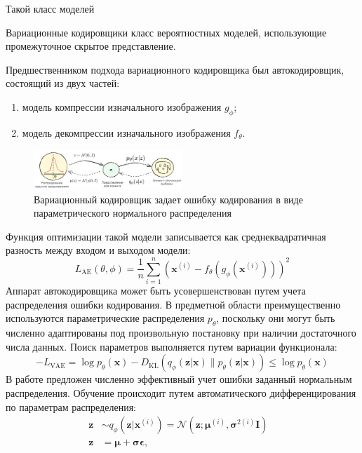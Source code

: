

Такой класс моделей

Вариационные кодировщики класс вероятностных моделей, использующие промежуточное скрытое представление.

Предшественником подхода вариационного кодировщика был автокодировщик, состоящий из двух частей: \begin{enumerate}
    \item модель компрессии изначального изображения $g_\phi$;
    \item модель декомпрессии изначального изображения $f_\theta$.
\end{enumerate}

\begin{figure}[h]
    \centering
    \includegraphics[width=0.5\textwidth]{assets/ml/generation/vae.excalidraw.png}
    \caption{Вариационный кодировщик задает ошибку кодирования в виде параметрического нормального распределения}
    \label{discr_vs_gen}
\end{figure}
Функция оптимизации такой модели записывается как среднеквадратичная разность между входом и выходом модели:
\begin{equation}
    L_\text{AE}(\theta, \phi) = \frac{1}{n}\sum_{i=1}^n (\mathbf{x}^{(i)} - f_\theta(g_\phi(\mathbf{x}^{(i)})))^2
\end{equation}
Аппарат автокодировщика может быть усовершенствован путем учета распределения ошибки кодирования. В предметной области
преимущественно используются параметрические распределения $p_\theta$, поскольку они могут быть численно адаптированы под 
произвольную постановку при наличии достаточного числа данных. Поиск параметров выполняется путем вариации функционала:
\begin{equation}
    -L_\text{VAE} = \log p_\theta(\mathbf{x}) - D_\text{KL}( q_\phi(\mathbf{z}\vert\mathbf{x}) \| p_\theta(\mathbf{z}\vert\mathbf{x}) ) \leq \log p_\theta(\mathbf{x})
\end{equation}
В работе \cite{kingma2013auto} предложен численно эффективный учет ошибки заданный нормальным распределения.
Обучение происходит путем автоматического дифференцирования по параметрам распределения: 
\begin{equation}
    \begin{aligned}
        \mathbf{z} &\sim q_\phi(\mathbf{z}\vert\mathbf{x}^{(i)}) = \mathcal{N}(\mathbf{z}; \boldsymbol{\mu}^{(i)}, \boldsymbol{\sigma}^{2(i)}\boldsymbol{I}) & \\
        \mathbf{z} &= \boldsymbol{\mu} + \boldsymbol{\sigma} \boldsymbol{\epsilon},
    \end{aligned}
\end{equation}
